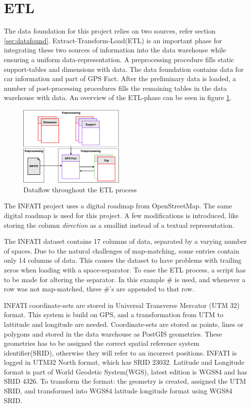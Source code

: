 \section{ETL}\label{sec:ETL}
The data foundation for this project relies on two sources, refer section \ref{sec:datafound}. Extract-Transform-Load(ETL) is an important phase for integrating these two sources of information into the data warehouse while ensuring a uniform data-representation. A preprocessing procedure fills static support-tables and dimensions with data. The data foundation contains data for car information and part of GPS Fact. After the preliminary data is loaded, a number of post-processing procedures fills the remaining tables in the data warehouse with data. An overview of the ETL-phase can be seen in figure \ref{fig:etl}.

\begin{figure}[tb]
\centering
\includegraphics[width=0.465\textwidth]{Pictures/ETL}
\caption{Dataflow throughout the ETL process}
\label{fig:etl}
\end{figure}

The INFATI project\cite{art:INFATI} uses a digital roadmap from OpenStreetMap\cite{osm}. The same digital roadmap is used for this project. A few modifications is introduced, like storing the column \textit{direction} as a smallint instead of a textual representation. 

The INFATI dataset\cite{art:INFATI} contains 17 columns of data, separated by a varying number of spaces. Due to the natural challenges of map-matching, some entries contain only 14 columns of data. This causes the dataset to have problems with trailing zeros when loading with a space-separator. To ease the ETL process, a script has to be made for altering the separator. In this example \# is used, and whenever a row was not map-matched, three \#'s are appended to that row.

INFATI coordinate-sets are stored in Universal Transverse Mercator (UTM 32) format. This system is build on GPS, and a transformation from UTM to lattitude and longitude are needed. Coordinate-sets are stored as points, lines or polygons and stored in the data warehouse as PostGIS\cite{postgis} geometries. These geometries has to be assigned the correct spatial reference system identifier(SRID), otherwise they will refer to an incorrect positions. INFATI is logged in UTM32 North format, which has SRID 23032\cite{UTM32N}. Latitude and Longitude format is part of World Geodetic System(WGS), latest edition is WGS84 and has SRID 4326\cite{WGS84}. To transform the format: the geometry is created, assigned the UTM SRID, and transformed into WGS84 latitude longitude format using WGS84 SRID. 

